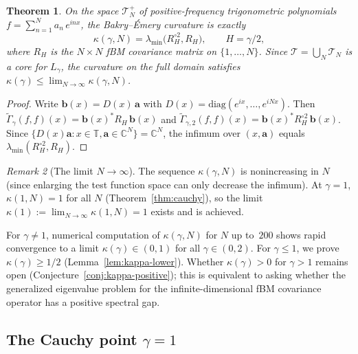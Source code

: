 \documentclass[11pt,a4paper]{article}
\theoremstyle{plain}
\newtheorem{theorem}{Theorem}[section]
\theoremstyle{definition}
\theoremstyle{remark}
\newtheorem{remark}[theorem]{Remark}
\newcommand{\C}{\mathbb{C}}
\newcommand{\T}{\mathbb{T}}
\begin{document}
\begin{theorem}\label{thm:curvature}
On the space $\mathcal{T}_N^+$ of positive-frequency trigonometric
polynomials $f = \sum_{n=1}^N a_n\,e^{inx}$, the Bakry--\'Emery
curvature is exactly
\begin{equation}\label{eq:kappa-def}
  \kappa(\gamma,N) = \lambda_{\min}\!\bigl(R_H^{\circ 2}, R_H\bigr),
  \qquad H = \gamma/2,
\end{equation}
where $R_H$ is the $N \times N$ fBM covariance matrix on $\{1,\ldots,N\}$.
Since $\mathcal{T} = \bigcup_N \mathcal{T}_N$ is a core for $L_\gamma$,
the curvature on the full domain satisfies
$\kappa(\gamma) \leq \lim_{N\to\infty} \kappa(\gamma,N)$.
\end{theorem}

\begin{proof}
Write $\mathbf{b}(x) = D(x)\,\mathbf{a}$ with
$D(x) = \mathrm{diag}(e^{ix},\ldots,e^{iNx})$. Then
$\widetilde{\Gamma}_\gamma(f,f)(x) = \mathbf{b}(x)^* R_H\,\mathbf{b}(x)$
and $\widetilde{\Gamma}_{\gamma,2}(f,f)(x) =
\mathbf{b}(x)^* R_H^{\circ 2}\,\mathbf{b}(x)$.
Since $\{D(x)\mathbf{a} : x \in \T, \mathbf{a} \in \C^N\} = \C^N$,
the infimum over $(x,\mathbf{a})$ equals
$\lambda_{\min}(R_H^{\circ 2}, R_H)$.
\end{proof}

\begin{remark}[The limit $N \to \infty$]
\label{rem:N-limit}
The sequence $\kappa(\gamma,N)$ is nonincreasing in $N$
(since enlarging the test function space can only decrease
the infimum).  At $\gamma = 1$, $\kappa(1,N) = 1$ for all
$N$ (Theorem~\ref{thm:cauchy}), so the limit
$\kappa(1) := \lim_{N\to\infty}\kappa(1,N) = 1$ exists
and is achieved.

For $\gamma \neq 1$, numerical computation of $\kappa(\gamma,N)$
for $N$ up to~$200$ shows rapid convergence to a limit
$\kappa(\gamma) \in (0,1)$ for all $\gamma \in (0,2)$.
For $\gamma \leq 1$, we prove $\kappa(\gamma) \geq 1/2$
(Lemma~\ref{lem:kappa-lower}). Whether $\kappa(\gamma) > 0$
for $\gamma > 1$ remains open
(Conjecture~\ref{conj:kappa-positive});
this is equivalent to asking
whether the generalized eigenvalue problem for the
infinite-dimensional fBM covariance operator has a positive
spectral gap.
\end{remark}


\subsection{The Cauchy point $\gamma = 1$}\label{sec:cauchy}
\end{document}
